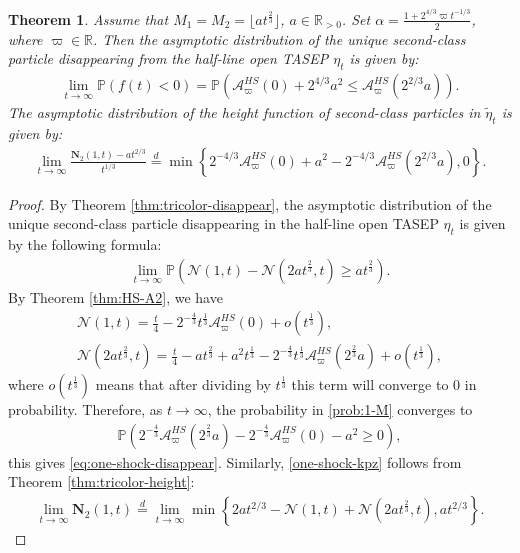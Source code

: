 \documentclass[12pt,a4paper]{amsart}
\newtheorem{theorem}{Theorem} %
\theoremstyle{remark}
\numberwithin{equation}{section} \numberwithin{theorem}{section}
\begin{document}
\begin{theorem}
\label{thm:one-shock-KPZ-5}
Assume that $M_1=M_2=\lfloor at^{\frac23} \rfloor$, $a\in \mathbb{R}_{>0}$. Set $\alpha = \frac{1+2^{4/3}\varpi t^{-1/3}}{2}$, where $\varpi \in \mathbb{R}$. Then the asymptotic distribution  of the unique second-class particle disappearing from the half-line open TASEP $\eta_t$ is given by:
\begin{align}
\label{eq:one-shock-disappear}
\lim_{t \to \infty}\mathbb{P}(f(t)<0)  = \mathbb{P}\left(\mathcal{A}_{\varpi}^{HS}(0)+2^{4/3}a^2 \leq \mathcal{A}_{\varpi}^{HS}(2^{2/3}a)\right).
\end{align}
The asymptotic distribution  of the height function of second-class particles in $\tilde{\eta}_{t}$ is given by:
\begin{align}
\label{one-shock-kpz}
\lim_{t\to\infty}\frac{\mathbf{N}_{2} (1,t)-at^{2/3}}{t^{1/3}} \stackrel{d}{=} \min \left\{2^{-4/3}\mathcal{A}_{\varpi}^{HS}(0)+a^2 - 2^{-4/3}\mathcal{A}_{\varpi}^{HS}(2^{2/3}a),0 \right\}.
\end{align}
\end{theorem}

\begin{proof}
By Theorem \ref{thm:tricolor-disappear}, the asymptotic distribution  of the unique second-class particle disappearing in the half-line open TASEP $\eta_t$ is given by the following formula:
\begin{align}
\label{prob:1-M}
\lim_{t\to\infty}\mathbb{P}(\mathcal{N}(1,t)-\mathcal{N}(2at^{\frac23},t) \geq at^{\frac23}).
\end{align}
By Theorem \ref{thm:HS-A2}, we have 
\begin{align*}
\mathcal{N}(1,t)=\frac{t}{4}-2^{-\frac{4}{3}}t^{\frac{1}{3}}\mathcal{A}_{\varpi}^{HS}(0)+o(t^{\frac{1}{3}}),\\
\mathcal{N}(2at^{\frac23},t)=\frac{t}{4}-a t^{\frac23}+a^2 t^{\frac13}-2^{-\frac{4}{3}}t^{\frac{1}{3}}\mathcal{A}_{\varpi}^{HS}(2^{\frac23}a)+o(t^{\frac{1}{3}}),
\end{align*}
where $o(t^{\frac{1}{3}})$ means that after dividing by $t^{\frac{1}{3}}$ this term will converge to 0 in probability. Therefore, as $t \to \infty$, the probability in \eqref{prob:1-M} converges to
\begin{align*}
\mathbb{P}\left( 2^{-\frac{4}{3}}\mathcal{A}_{\varpi}^{HS}(2^{\frac23}a)-2^{-\frac{4}{3}}\mathcal{A}_{\varpi}^{HS}(0)-a^2 \geq 0\right),
\end{align*}
this gives \eqref{eq:one-shock-disappear}. Similarly, \eqref{one-shock-kpz} follows from Theorem \ref{thm:tricolor-height}:
\begin{align*}
\lim_{t\to\infty} \mathbf{N}_{2} (1,t) \stackrel{d}{=} \lim_{t\to\infty}\min \left\{2at^{2/3}-\mathcal{N}(1,t)+\mathcal{N}(2at^{\frac23},t),at^{2/3} \right\}.
\end{align*}
\end{proof}
\end{document}
